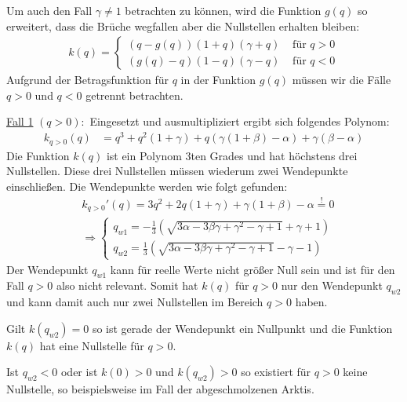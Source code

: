 \documentclass[a4paper,twoside]{article}
\begin{document}
	
	Um auch den Fall \(\gamma \neq 1\) betrachten zu können, wird die Funktion \(g(q)\) so erweitert, dass die Brüche wegfallen aber die Nullstellen erhalten bleiben:
	\begin{align*}
		k(q) = \left\{ \begin{array}{ll}
			\left( q - g\left(q\right) \right)(1 + q)(\gamma + q) &\textrm{ für } q > 0  \\
			\left( g\left(q\right) - q \right)(1 - q)(\gamma - q) &\textrm{ für } q < 0
		\end{array} \right.
	\end{align*}
	Aufgrund der Betragsfunktion für \(q\) in der Funktion \(g(q)\) müssen wir die Fälle \(q > 0\) und \(q < 0\) getrennt betrachten. 
	
	\noindent\underline{Fall 1} \((q > 0):\)
	\noindent Eingesetzt und ausmultipliziert ergibt sich folgendes Polynom:
	\begin{align*}
		k_{q>0}(q) &= q^3 + q^2(1 + \gamma) + q\left(\gamma \left(1 + \beta\right) - \alpha \right) + \gamma \left( \beta - \alpha \right)
	\end{align*}
	Die Funktion \(k(q)\) ist ein Polynom 3ten Grades und hat höchstens drei Nullstellen. Diese drei Nullstellen müssen wiederum zwei Wendepunkte einschließen. Die Wendepunkte werden wie folgt gefunden:
	\begin{align*}
		&k_{q>0}'(q) = 3q^2 + 2q(1+\gamma) + \gamma(1+\beta) - \alpha \stackrel{!}{=} 0 \\
		&\Rightarrow \left\{ \begin{array}{l}
			q_{w1} = -\frac{1}{3}\left( \sqrt{3\alpha - 3\beta\gamma + \gamma^2 - \gamma + 1} +\gamma + 1 \right) \\
			q_{w2} = \frac{1}{3}\left( \sqrt{3\alpha - 3\beta\gamma + \gamma^2 - \gamma + 1} -\gamma - 1 \right)
		\end{array} \right.
	\end{align*}
	Der Wendepunkt \(q_{w1}\) kann für reelle Werte nicht größer Null sein und ist für den Fall \(q > 0\) also nicht relevant. Somit hat \(k(q)\) für \(q > 0\) nur den Wendepunkt \(q_{w2}\) und kann damit auch nur zwei Nullstellen im Bereich \(q > 0\) haben.
	
	Gilt \(k(q_{w2}) = 0\) so ist gerade der Wendepunkt ein Nullpunkt und die Funktion \(k(q)\) hat eine Nullstelle für \(q > 0\).
	
	Ist \(q_{w2} < 0\) oder ist \(k(0) > 0\) und \(k(q_{w2}) > 0\) so existiert für \(q > 0\) keine Nullstelle, so beispielsweise im Fall der abgeschmolzenen Arktis.
	
\end{document}
